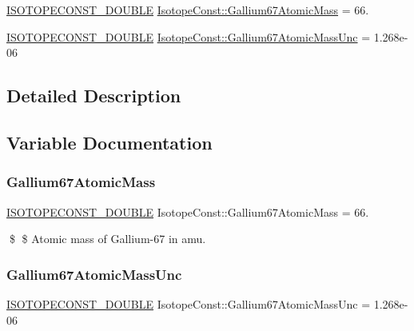 \begin{DoxyCompactItemize}
\item 
\mbox{\hyperlink{group___isotope_const-_macros_ga8f45a7272ce02c0b4c65c44636ed719a}{I\+S\+O\+T\+O\+P\+E\+C\+O\+N\+S\+T\+\_\+\+D\+O\+U\+B\+LE}} \mbox{\hyperlink{group___isotope_const-_gallium-_ga67_ga3e0832463279d8b636710a40a472000b}{Isotope\+Const\+::\+Gallium67\+Atomic\+Mass}} = 66.
\item 
\mbox{\hyperlink{group___isotope_const-_macros_ga8f45a7272ce02c0b4c65c44636ed719a}{I\+S\+O\+T\+O\+P\+E\+C\+O\+N\+S\+T\+\_\+\+D\+O\+U\+B\+LE}} \mbox{\hyperlink{group___isotope_const-_gallium-_ga67_ga3e016d4aa65958612cd1273f02e7107a}{Isotope\+Const\+::\+Gallium67\+Atomic\+Mass\+Unc}} = 1.\+268e-\/06
\end{DoxyCompactItemize}


\subsection{Detailed Description}


\subsection{Variable Documentation}
\mbox{\label{group___isotope_const-_gallium-_ga67_ga3e0832463279d8b636710a40a472000b}} 
\subsubsection{\texorpdfstring{Gallium67\+Atomic\+Mass}{Gallium67AtomicMass}}
{\footnotesize\ttfamily \mbox{\hyperlink{group___isotope_const-_macros_ga8f45a7272ce02c0b4c65c44636ed719a}{I\+S\+O\+T\+O\+P\+E\+C\+O\+N\+S\+T\+\_\+\+D\+O\+U\+B\+LE}} Isotope\+Const\+::\+Gallium67\+Atomic\+Mass = 66.}

\$ \$ Atomic mass of Gallium-\/67 in amu. \mbox{\label{group___isotope_const-_gallium-_ga67_ga3e016d4aa65958612cd1273f02e7107a}} 
\subsubsection{\texorpdfstring{Gallium67\+Atomic\+Mass\+Unc}{Gallium67AtomicMassUnc}}
{\footnotesize\ttfamily \mbox{\hyperlink{group___isotope_const-_macros_ga8f45a7272ce02c0b4c65c44636ed719a}{I\+S\+O\+T\+O\+P\+E\+C\+O\+N\+S\+T\+\_\+\+D\+O\+U\+B\+LE}} Isotope\+Const\+::\+Gallium67\+Atomic\+Mass\+Unc = 1.\+268e-\/06}

